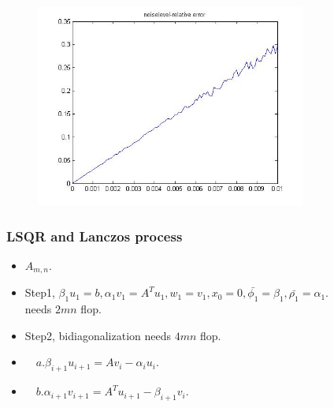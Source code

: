 \documentclass{beamer}
\begin{document}
\begin{frame}
\begin{figure}[htbp]
\begin{minipage}[b]{0.8\linewidth}
\includegraphics[width=3.5in]{Images/noiselevel_relativeerror}
\end{minipage}
\end{figure}

\end{frame}


\begin{frame}
\frametitle{LSQR and Lanczos process}
\begin{itemize}
    \item $A_{m,n}$.
    \item Step1, $\beta_{1}u_{1}=b, \alpha_{1}v_{1}=A^{T}u_{1}, w_{1}=v_{1}, x_{0}=0, \bar{\phi_{1}}=\beta_{1},\bar{\rho_{1}}=\alpha_{1}$.\\
                 needs $2mn$ flop.
    \item Step2, bidiagonalization needs $4mn$ flop.
    \item       $\quad a.\beta_{i+1}u_{i+1}=Av_{i}-\alpha_{i}u_{i}$.
    \item       $\quad b.\alpha_{i+1}v_{i+1}=A^{T}u_{i+1}-\beta_{i+1}v_{i}$.
\end{itemize}
\end{frame}
\end{document}
